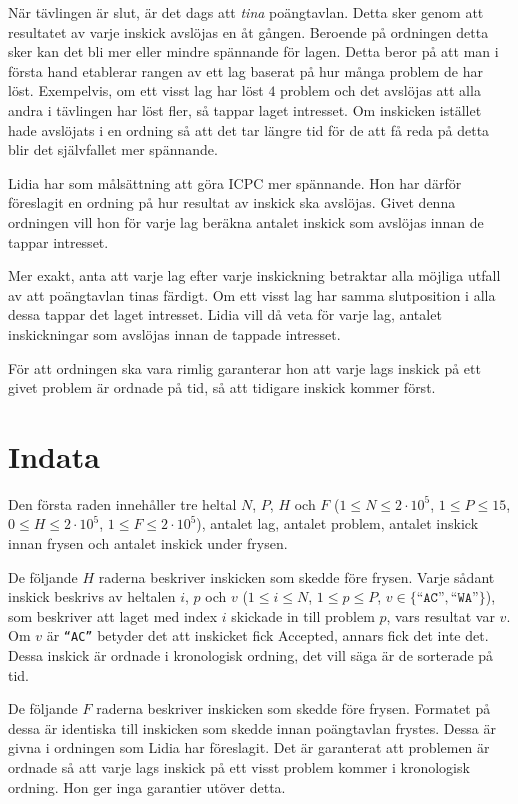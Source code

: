 När tävlingen är slut, är det dags att \textit{tina} poängtavlan.
Detta sker genom att resultatet av varje inskick avslöjas en åt gången.
Beroende på ordningen detta sker kan det bli mer eller mindre spännande för lagen.
Detta beror på att man i första hand etablerar rangen av ett lag baserat på hur många problem de har löst.
Exempelvis, om ett visst lag har löst $4$ problem och det avslöjas att alla andra i tävlingen har löst fler,
så tappar laget intresset.
Om inskicken istället hade avslöjats i en ordning så att det tar längre tid för de att få reda på detta blir det självfallet mer spännande.

Lidia har som målsättning att göra ICPC mer spännande.
Hon har därför föreslagit en ordning på hur resultat av inskick ska avslöjas.
Givet denna ordningen vill hon för varje lag beräkna antalet inskick som avslöjas innan de tappar intresset.

Mer exakt, anta att varje lag efter varje inskickning betraktar alla möjliga utfall av att poängtavlan tinas färdigt.
Om ett visst lag har samma slutposition i alla dessa tappar det laget intresset.
Lidia vill då veta för varje lag, antalet inskickningar som avslöjas innan de tappade intresset.

För att ordningen ska vara rimlig garanterar hon att varje lags inskick på ett givet problem är ordnade på tid,
så att tidigare inskick kommer först.

\section*{Indata}
Den första raden innehåller tre heltal $N$, $P$, $H$ och $F$
($1 \leq N \leq 2 \cdot 10^5$, $1 \leq P \leq 15$, $0 \leq H \leq 2 \cdot 10^5$, $1 \leq F \leq 2 \cdot 10^5$),
antalet lag, antalet problem, antalet inskick innan frysen och antalet inskick under frysen.

De följande $H$ raderna beskriver inskicken som skedde före frysen.
Varje sådant inskick beskrivs av heltalen $i$, $p$ och $v$
($1 \leq i \leq N$, $1 \leq p \leq P$, $v \in \{\texttt{``AC''} , \texttt{``WA''}\}$),
som beskriver att laget med index $i$ skickade in till problem $p$,
vars resultat var $v$. Om $v$ är \texttt{``AC''} betyder det att inskicket fick Accepted, annars fick det inte det.
Dessa inskick är ordnade i kronologisk ordning, det vill säga är de sorterade på tid.

De följande $F$ raderna beskriver inskicken som skedde före frysen.
Formatet på dessa är identiska till inskicken som skedde innan poängtavlan frystes.
Dessa är givna i ordningen som Lidia har föreslagit.
Det är garanterat att problemen är ordnade så att varje lags inskick på ett visst problem kommer i kronologisk ordning.
Hon ger inga garantier utöver detta.


